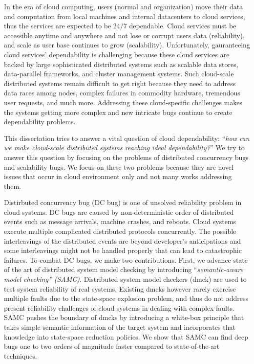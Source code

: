 In the era of cloud computing, users (normal and organization) move their data
and computation from local machines and internal datacenters to cloud services,
thus the services are expected to be 24/7 dependable. Cloud services must be
accessible anytime and anywhere and not lose or corrupt users data
(reliability), and scale as user base continues to grow (scalability).
Unfortunately, gauranteeing cloud services' dependability is challenging because
these cloud services are backed by large sophisticated distributed systems such
as scalable data stores, data-parallel frameworks, and cluster management
systems. Such cloud-scale distributed systems remain difficult to get right
because they need to address data races among nodes, complex failures in
commodity hardware, tremendous user requests, and much more. Addressing these
cloud-specific challenges makes the systems getting more complex and new
intricate bugs continue to create dependability problems.

This dissertation tries to answer a vital question of cloud dependability:
``{\em how can we make cloud-scale distributed systems reaching ideal
dependability?}'' We try to answer this question by focusing on the problems of
distributed concurrency bugs and scalability bugs. We focus on these two
problems because they are novel issues that occur in cloud environment only and
not many works addressing them.

Distirbuted concurrency bug (DC bug) is one of unsolved reliability problem in
cloud systems. DC bugs are caused by non-deterministic order of distributed
events such as message arrivals, machine crashes, and reboots. Cloud systems
execute multiple complicated distributed protocols concurrently. The possible
interleavings of the distributed events are beyond developer's anticipations and
some interleavings might not be handled properly that can lead to catastrophic
failures.
%
To combat DC bugs, we make two contributions. First, we advance state of the
art of distributed system model checking by introducing ``{\em semantic-aware
model checking'' (SAMC)}. Distributed system model checkers (dmck) are used to
test system reliability of real systems. Existing dmcks however rarely exercise
multiple faults due to the state-space explosion problem, and thus do not
address present reliability challenges of cloud systems in dealing with complex
faults. SAMC pushes the boundary of dmcks by introducing a white-box principle
that takes simple semantic information of the target system and incorporates
that knowledge into state-space reduction policies.  We show that SAMC can find
deep bugs one to two orders of magnitude faster compared to state-of-the-art
techniques. 

